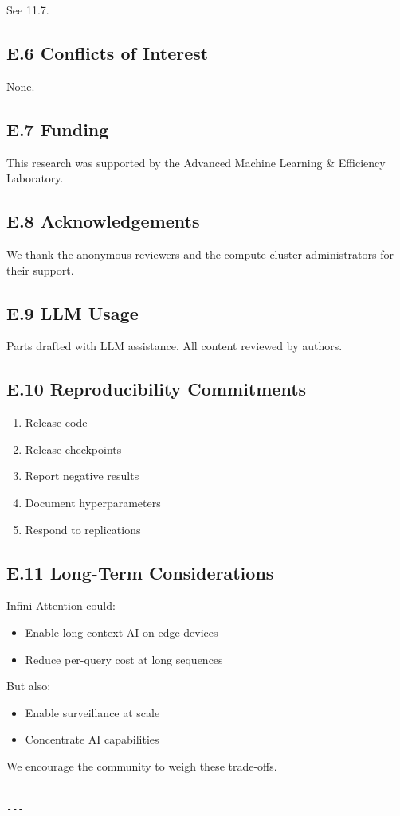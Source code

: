 See  11.7.

\subsection{E.6 Conflicts of Interest}

None.

\subsection{E.7 Funding}

This research was supported by the Advanced Machine Learning \& Efficiency Laboratory.

\subsection{E.8 Acknowledgements}

We thank the anonymous reviewers and the compute cluster administrators for their support.

\subsection{E.9 LLM Usage}

Parts drafted with LLM assistance. All content reviewed by authors.

\subsection{E.10 Reproducibility Commitments}

\begin{enumerate}
\item Release code
\item Release checkpoints
\item Report negative results
\item Document hyperparameters
\item Respond to replications

\end{enumerate}
\subsection{E.11 Long-Term Considerations}

Infini-Attention could:

\begin{itemize}
\item Enable long-context AI on edge devices
\item Reduce per-query cost at long sequences

\end{itemize}
But also:

\begin{itemize}
\item Enable surveillance at scale
\item Concentrate AI capabilities

\end{itemize}
We encourage the community to weigh these trade-offs.
\begin{lstlisting}

---
\end{lstlisting}